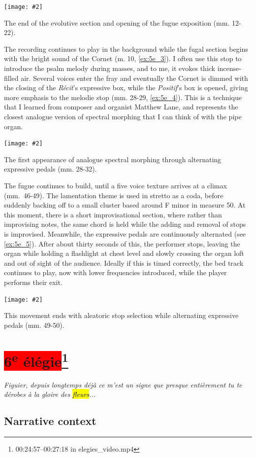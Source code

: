 \documentclass[12pt,twoside,maitrise]{dms_ks}
\newcommand{\customincludeexamples}[4][]{%
    \begin{example}[H]
        \centering
        \texttt{[image: \#2]}
        \caption{#4}
	\label{#3} 
    \end{example}
}
\theoremstyle{definition}
\begin{document}
{{\customincludeexamples[width=\textwidth]{5e_3}{ex:5e_3}{The end of the evolutive section and opening of the fugue exposition (mm. 12-22).}

The recording continues to play in the background while the fugal section begins with the bright sound of the Cornet (m. 10, \cref{ex:5e_3}). 
I often use this stop to introduce the psalm melody during masses, and to me, it evokes thick incense-filled air. 
Several voices enter the fray and eventually the Cornet is dimmed with the closing of the \textit{Récit}'s expressive box, while the \textit{Positif}'s box is opened, giving more emphasis to the melodie stop (mm. 28-29, \cref{ex:5e_4}). 
This is a technique that I learned from composer and organist Matthew Lane, and represents the closest analogue version of spectral morphing that I can think of with the pipe organ. 
\customincludeexamples[width=\textwidth]{5e_4}{ex:5e_4}{The first appearance of analogue spectral morphing through alternating expressive pedals (mm. 28-32).}

The fugue continues to build, until a five voice texture arrives at a climax (mm.~46-49). The lamentation theme is used in stretto as a coda, before suddenly backing off to a small cluster based around F minor in measure 50.
At this moment, there is a short improvisational section, where rather than improvising notes, the same chord is held while the adding and removal of stops is improvised.
Meanwhile, the expressive pedals are continuously alternated (see \cref{ex:5e_5}). After about thirty seconds of this, the performer stops, leaving the organ while holding a flashlight at chest level and slowly crossing the organ loft and out of sight of the audience. Ideally if this is timed correctly, the bed track continues to play, now with lower frequencies introduced, while the player performs their exit.

\customincludeexamples[width=\textwidth]{5e_5}{ex:5e_5}{This movement ends with aleatoric stop selection while alternating expressive pedals (mm. 49-50).}

\section{\colorbox{red}{6\textsuperscript{e} élégie}\footnote{00:24:57--00:27:18 in elegies\_video.mp4}}

\epigraph{\textit{Figuier, depuis longtemps déjà ce m'est un signe que presque entièrement tu te dérobes à la gloire des \hl{fleurs}...}}{}

\subsection{Narrative context}

}}
\end{document}
